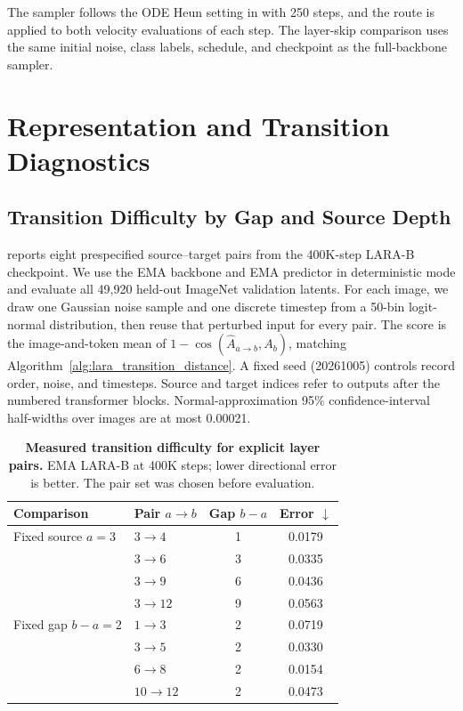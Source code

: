 The sampler follows the ODE Heun setting in  with 250 steps, and the route is applied to both velocity evaluations of each step. The layer-skip comparison uses the same initial noise, class labels, schedule, and checkpoint as the full-backbone sampler.

\section{Representation and Transition Diagnostics}
\label{app:layer_statistics_projection}

\subsection{Transition Difficulty by Gap and Source Depth}
\label{app:transition_difficulty}

 reports eight prespecified source--target pairs from the 400K-step LARA-B checkpoint. We use the EMA backbone and EMA predictor in deterministic mode and evaluate all 49,920 held-out ImageNet validation latents. For each image, we draw one Gaussian noise sample and one discrete timestep from a 50-bin logit-normal distribution, then reuse that perturbed input for every pair. The score is the image-and-token mean of $1-\cos(\widehat A_{a\to b},A_b)$, matching Algorithm~\ref{alg:lara_transition_distance}. A fixed seed (20261005) controls record order, noise, and timesteps. Source and target indices refer to outputs after the numbered transformer blocks. Normal-approximation 95\% confidence-interval half-widths over images are at most 0.00021.

\begin{table}[!htbp]
    \centering
    \caption{\textbf{Measured transition difficulty for explicit layer pairs.} EMA LARA-B at 400K steps; lower directional error is better. The pair set was chosen before evaluation.}
    \label{tab:appendix_transition_difficulty}
    \footnotesize
    \setlength{\tabcolsep}{4pt}
    \begin{tabular}{@{}llcc@{}}
        \toprule
        Comparison & Pair $a\to b$ & Gap $b-a$ & Error $\downarrow$ \\
        \midrule
        Fixed source $a=3$ & $3\to4$ & 1 & 0.0179 \\
        & $3\to6$ & 3 & 0.0335 \\
        & $3\to9$ & 6 & 0.0436 \\
        & $3\to12$ & 9 & 0.0563 \\
        \midrule
        Fixed gap $b-a=2$ & $1\to3$ & 2 & 0.0719 \\
        & $3\to5$ & 2 & 0.0330 \\
        & $6\to8$ & 2 & 0.0154 \\
        & $10\to12$ & 2 & 0.0473 \\
        \bottomrule
    \end{tabular}
\end{table}

